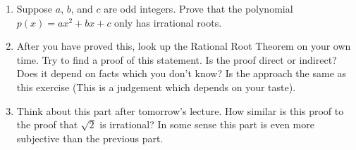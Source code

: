 \begin{enumerate}
    \item Suppose $a$, $b$, and $c$ are odd integers. Prove that the polynomial $p(x) = ax^2 + bx + c$ only has irrational roots.
    \item After you have proved this, look up the Rational Root Theorem on your own time. Try to find a proof of this statement. Is the proof direct or indirect? Does it depend on facts which you don't know? Is the approach the same as this exercise (This is a judgement which depends on your taste).
    \item Think about this part after tomorrow's lecture. How similar is this proof to the proof that $\sqrt{2}$ is irrational? In some sense this part is even more subjective than the previous part.
\end{enumerate}
